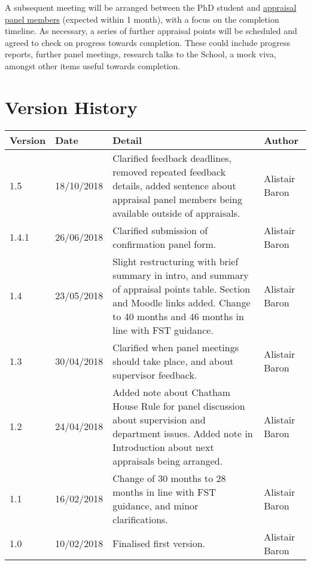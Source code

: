 \documentclass[12pt,a4paper]{article}
\begin{document}
A subsequent meeting will be arranged between the PhD student and \hyperref[sec:panel]{appraisal panel members} (expected within 1 month), with a focus on the completion timeline. As necessary, a series of further appraisal points will be scheduled and agreed to check on progress towards completion. These could include progress reports, further panel meetings, research talks to the School, a mock viva, amongst other items useful towards completion.


\section{Version History}
\begin{tabularx}{\textwidth}{llXl}
	\textbf{Version} & \textbf{Date} & \textbf{Detail} & \textbf{Author} \\ 
	\hline
	1.5 & 18/10/2018 & Clarified feedback deadlines, removed repeated feedback details, added sentence about appraisal panel members being available outside of appraisals. & Alistair Baron\\
	1.4.1 & 26/06/2018 & Clarified submission of confirmation panel form. & Alistair Baron\\
	1.4 & 23/05/2018 & Slight restructuring with brief summary in intro, and summary of appraisal points table. Section and Moodle links added. Change to 40 months and 46 months in line with FST guidance. & Alistair Baron\\
	1.3 & 30/04/2018 & Clarified when panel meetings should take place, and about supervisor feedback. & Alistair Baron\\
	1.2	& 24/04/2018 & Added note about Chatham House Rule for panel discussion about supervision and department issues. Added note in Introduction about next appraisals being arranged. & Alistair Baron\\
	1.1	& 16/02/2018 & Change of 30 months to 28 months in line with FST guidance, and minor clarifications. & Alistair Baron\\
	1.0 & 10/02/2018 & Finalised first version. & Alistair Baron\\ 
\end{tabularx} 
\end{document}
